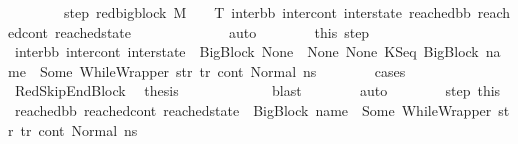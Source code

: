 \begin{isabellebody}
\ \ \ \ \ \ \ \ step{}{\isacharcolon}{\kern0pt}\ {\isachardoublequoteopen}{\isacharparenleft}{\kern0pt}red{\isacharunderscore}{\kern0pt}bigblock\ M\ {\isasymLambda}\ {\isasymGamma}\ {\isasymOmega}\ T\ {\isacharparenleft}{\kern0pt}inter{\isacharunderscore}{\kern0pt}bb{\isacharcomma}{\kern0pt}\ inter{\isacharunderscore}{\kern0pt}cont{\isacharcomma}{\kern0pt}\ inter{\isacharunderscore}{\kern0pt}state{\isacharparenright}{\kern0pt}\ {\isacharparenleft}{\kern0pt}reached{\isacharunderscore}{\kern0pt}bb{\isacharcomma}{\kern0pt}\ reached{\isacharunderscore}{\kern0pt}cont{\isacharcomma}{\kern0pt}\ reached{\isacharunderscore}{\kern0pt}state{\isacharparenright}{\kern0pt}{\isacharparenright}{\kern0pt}{\isachardoublequoteclose}\ \isanewline
\ \ \ \ \ \ \ \ \isamarkupfalse%
\ {\isachardoublequoteopen}{}{\isachardoublequoteclose}\ \isamarkupfalse%
\ auto\isanewline
\ \ \ \ \ \ \isamarkupfalse%
\ this\ step{}\ \isamarkupfalse%
\ {\isachardoublequoteopen}{\isacharparenleft}{\kern0pt}inter{\isacharunderscore}{\kern0pt}bb{\isacharcomma}{\kern0pt}\ inter{\isacharunderscore}{\kern0pt}cont{\isacharcomma}{\kern0pt}\ inter{\isacharunderscore}{\kern0pt}state{\isacharparenright}{\kern0pt}\ {\isacharequal}{\kern0pt}\ {\isacharparenleft}{\kern0pt}BigBlock\ None\ {\isacharbrackleft}{\kern0pt}{\isacharbrackright}{\kern0pt}\ None\ None{\isacharcomma}{\kern0pt}\ {\isacharparenleft}{\kern0pt}KSeq\ {\isacharparenleft}{\kern0pt}BigBlock\ name\ {\isacharbrackleft}{\kern0pt}{\isacharbrackright}{\kern0pt}\ {\isacharparenleft}{\kern0pt}Some\ {\isacharparenleft}{\kern0pt}WhileWrapper\ str{\isacharparenright}{\kern0pt}{\isacharparenright}{\kern0pt}\ tr{\isacharparenright}{\kern0pt}\ cont{}{\isacharparenright}{\kern0pt}{\isacharcomma}{\kern0pt}\ Normal\ ns{}{\isacharparenright}{\kern0pt}{\isachardoublequoteclose}\isanewline
\ \ \ \ \ \ \isamarkupfalse%
\ cases\isanewline
\ \ \ \ \ \ \ \ \isamarkupfalse%
\ RedSkipEndBlock\ \isamarkupfalse%
\ {\isacharquery}{\kern0pt}thesis\ \isanewline
\ \ \ \ \ \ \ \ \ \ \isamarkupfalse%
\ blast\isanewline
\ \ \ \ \ \ \isamarkupfalse%
\ auto\isanewline
\ \ \ \ \ \ \isamarkupfalse%
\ step{}\ this\ \isamarkupfalse%
\ {\isachardoublequoteopen}{\isacharparenleft}{\kern0pt}reached{\isacharunderscore}{\kern0pt}bb{\isacharcomma}{\kern0pt}\ reached{\isacharunderscore}{\kern0pt}cont{\isacharcomma}{\kern0pt}\ reached{\isacharunderscore}{\kern0pt}state{\isacharparenright}{\kern0pt}\ {\isacharequal}{\kern0pt}\ {\isacharparenleft}{\kern0pt}{\isacharparenleft}{\kern0pt}BigBlock\ name\ {\isacharbrackleft}{\kern0pt}{\isacharbrackright}{\kern0pt}\ {\isacharparenleft}{\kern0pt}Some\ {\isacharparenleft}{\kern0pt}WhileWrapper\ str{\isacharparenright}{\kern0pt}{\isacharparenright}{\kern0pt}\ tr{\isacharparenright}{\kern0pt}{\isacharcomma}{\kern0pt}\ cont{}{\isacharcomma}{\kern0pt}\ Normal\ ns{}{\isacharparenright}{\kern0pt}{\isachardoublequoteclose}\ \isanewline

\end{isabellebody}
